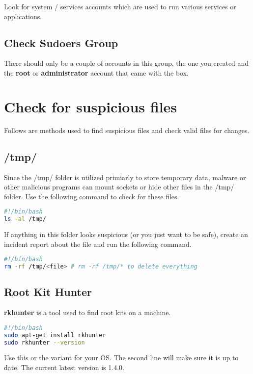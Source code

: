 \documentclass{article}
\begin{document}
Look for system / services accounts which are used to run various services or
applications. 

\subsection{Check Sudoers Group}
There should only be a couple of accounts in this group, the one you created and
the \textbf{root} or \textbf{administrator} account that came with the box.


\section{Check for suspicious files}
Follows are methods used to find suspicious files and check valid files for changes.

\subsection{/tmp/}
Since the /tmp/ folder is utilized primiarly to store temporary data, malware or
other malicious programs can mount sockets or hide other files in the /tmp/
folder.  Use the following command to check for these files.

\begin{lstlisting}[language=bash]
#!/bin/bash
ls -al /tmp/
\end{lstlisting}

If anything in this folder looks suspicious (or you just want to be safe), create
an incident report about the file and run the following command.

\begin{lstlisting}[language=bash]
#!/bin/bash
rm -rf /tmp/<file> # rm -rf /tmp/* to delete everything
\end{lstlisting}

\subsection{Root Kit Hunter}
\textbf{rkhunter} is a tool used to find root kits on a machine.

\begin{lstlisting}[language=bash]
#!/bin/bash
sudo apt-get install rkhunter
sudo rkhunter --version
\end{lstlisting}

Use this or the variant for your OS. The second line will make sure it is up to
date. The current latest version is 1.4.0.
\end{document}
